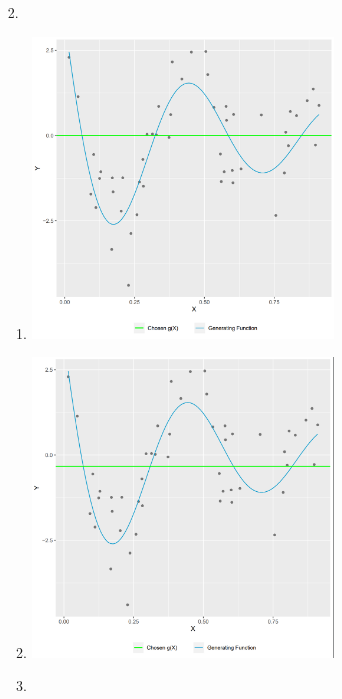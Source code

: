 \documentclass{article}
\begin{document}
\begin{enumerate}
\begin{enumerate}
    \end{enumerate}
    
    \item [2. ]
    
    \begin{enumerate}
        \item 
        
        \begin{center}
        \includegraphics[width=8cm]{graph_2a.png}
        \end{center}
        
        \item 
        
        \begin{center}
        \includegraphics[width=8cm]{graph_2b.png}
        \end{center}
        
        \item 
        

\end{enumerate}
\end{enumerate}
\end{document}
